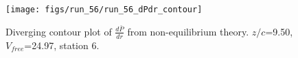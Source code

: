 \begin{figure}[H]
\centering
\texttt{[image: figs/run\_56/run\_56\_dPdr\_contour]}
\caption{Diverging contour plot of $\frac{d\bar{P}}{dr}$ from non-equilibrium theory. $z/c$=9.50, $V_{free}$=24.97, station 6.}
\label{fig:run_56_dPdr_contour}
\end{figure}


